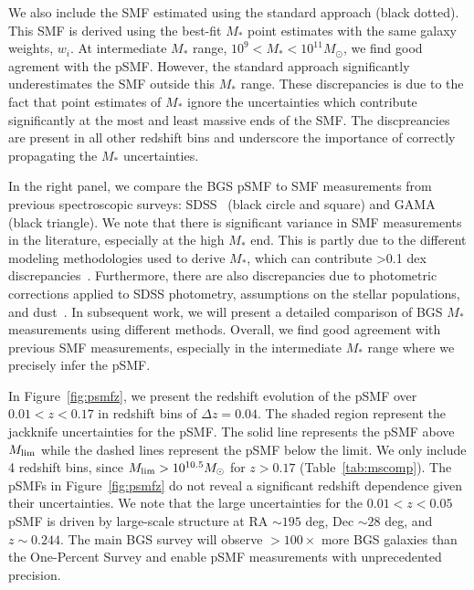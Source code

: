 We also include the SMF estimated using the standard approach (black dotted). 
This SMF is derived using the best-fit $M_*$ point estimates with the same
galaxy weights, $w_i$. 
At intermediate $M_*$ range, $10^9 < M_* < 10^{11}M_\odot$, we find good
agrement with the pSMF. 
However, the standard approach significantly underestimates the SMF outside
this $M_*$ range. 
These discrepancies is due to the fact that point estimates of $M_*$ ignore the
uncertainties which contribute significantly at the most and least massive ends
of the SMF.
The discpreancies are present in all other redshift bins and underscore the
importance of correctly propagating the $M_*$ uncertainties. 

In the right panel, we compare the BGS pSMF to SMF measurements from previous 
spectroscopic surveys: SDSS~\citep{moustakas2013, bernardi2017} (black circle
and square) and GAMA~\citep{driver2022} (black triangle).
We note that there is significant variance in SMF measurements in the
literature, especially at the high $M_*$ end. 
This is partly due to the different modeling methodologies used to derive
$M_*$, which can contribute >0.1 dex discrepancies~\citep{pacifici2023}. 
Furthermore, there are also discrepancies due to photometric corrections
applied to SDSS photometry, assumptions on the stellar populations, and
dust~\citep{bernardi2017}.
In subsequent work, we will present a detailed comparison of BGS $M_*$
measurements using different methods. 
Overall, we find good agreement with previous SMF measurements, especially in
the intermediate $M_*$ range where we precisely infer the pSMF.  

In Figure~\ref{fig:psmfz}, we present the redshift evolution of the pSMF over 
$0.01 < z < 0.17$ in redshift bins of $\Delta z = 0.04$. 
The shaded region represent the jackknife uncertainties for the pSMF.
The solid line represents the pSMF above $M_{\rm lim}$ while the dashed lines
represent the pSMF below the limit. 
We only include 4 redshift bins, since $M_{\rm lim} > 10^{10.5}M_\odot$ for 
$z > 0.17$ (Table~\ref{tab:mscomp}).
The pSMFs in Figure~\ref{fig:psmfz} do not reveal a significant redshift
dependence given their uncertainties. 
We note that the large uncertainties for the $0.01 < z < 0.05$ pSMF is driven
by large-scale structure at RA $\sim 195$ deg, Dec $\sim 28$ deg, and 
$z\sim0.244$. 
The main BGS survey will observe $>100\times$ more BGS galaxies than the
One-Percent Survey and enable pSMF measurements with unprecedented precision. 

